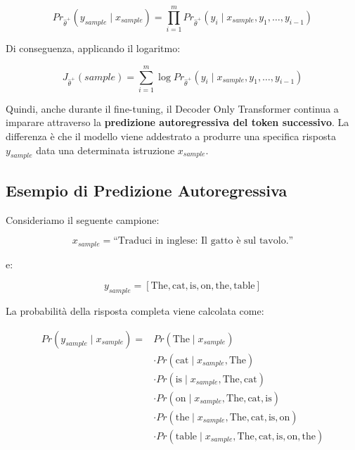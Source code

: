 \begin{equation}
Pr_{\hat{\theta}^+}(y_{sample}\mid x_{sample})
=
\prod_{i=1}^{m}
Pr_{\hat{\theta}^+}
\left(
y_i
\mid
x_{sample},y_1,\dots,y_{i-1}
\right)
\end{equation}

Di conseguenza, applicando il logaritmo:

\begin{equation}
\boxed{
J_{\hat{\theta}^+}(sample)
=
\sum_{i=1}^{m}
\log
Pr_{\hat{\theta}^+}
\left(
y_i
\mid
x_{sample},y_1,\dots,y_{i-1}
\right)
}
\end{equation}

Quindi, anche durante il fine-tuning, il Decoder Only Transformer
continua a imparare attraverso la \textbf{predizione autoregressiva del
token successivo}. La differenza è che il modello viene addestrato a
produrre una specifica risposta $y_{sample}$ data una determinata
istruzione $x_{sample}$.

\subsection*{Esempio di Predizione Autoregressiva}

Consideriamo il seguente campione:

\begin{equation}
x_{sample}
=
\text{``Traduci in inglese: Il gatto è sul tavolo.''}
\end{equation}

e:

\begin{equation}
y_{sample}
=
[\text{The},\text{cat},\text{is},\text{on},\text{the},\text{table}]
\end{equation}

La probabilità della risposta completa viene calcolata come:

\begin{align}
Pr(y_{sample}\mid x_{sample})
={}&
Pr(\text{The}\mid x_{sample})
\\
&\cdot
Pr(\text{cat}\mid x_{sample},\text{The})
\\
&\cdot
Pr(\text{is}\mid x_{sample},\text{The},\text{cat})
\\
&\cdot
Pr(\text{on}\mid x_{sample},\text{The},\text{cat},\text{is})
\\
&\cdot
Pr(\text{the}\mid x_{sample},\text{The},\text{cat},\text{is},\text{on})
\\
&\cdot
Pr(\text{table}\mid x_{sample},\text{The},\text{cat},\text{is},\text{on},\text{the})
\end{align}

